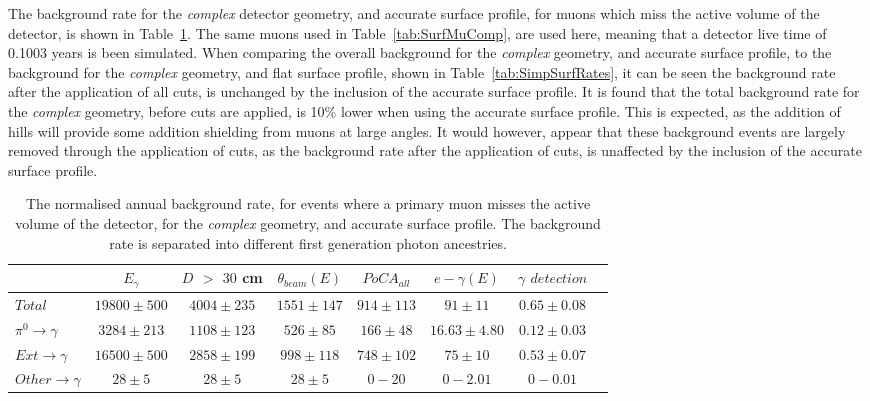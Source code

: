 The background rate for the \emph{complex} detector geometry, and accurate surface profile, for muons which miss the active volume of the detector, is shown in Table~\ref{tab:SurfMuMissComp}. The same muons used in Table~\ref{tab:SurfMuComp}, are used here, meaning that a detector live time of 0.1003 years is been simulated. When comparing the overall background for the \emph{complex} geometry, and accurate surface profile, to the background for the \emph{complex} geometry, and flat surface profile, shown in Table~\ref{tab:SimpSurfRates}, it can be seen the background rate after the application of all cuts, is unchanged by the inclusion of the accurate surface profile. It is found that the total background rate for the \emph{complex} geometry, before cuts are applied, is 10\% lower when using the accurate surface profile. This is expected, as the addition of hills will provide some addition shielding from muons at large angles. It would however, appear that these background events are largely removed through the application of cuts, as the background rate after the application of cuts, is unaffected by the inclusion of the accurate surface profile. \\

\begin{table}
  \caption[The normalised annual background rate, for events where a primary muon misses the active volume of the detector, for the \emph{complex} geometry, and accurate surface profile]
          {The normalised annual background rate, for events where a primary muon misses the active volume of the detector, for the \emph{complex} geometry, and accurate surface profile. The background rate is separated into different first generation photon ancestries.}
  \label{tab:SurfMuMissComp}
  \centering
  \scriptsize
  \begin{tabular}{l c c c c c c c }
    \toprule
        & $E_\gamma$ &  $D$ $>$ $30$ cm & $\theta_{beam}(E)$ & $PoCA_{all}$ & $e-\gamma(E)$ & $\gamma$ $detection$ \\
        \midrule
        $Total$          & $19800\pm500$ & $4004\pm235$ & $1551\pm147$ & $914\pm113$ & $91\pm11$      & $0.65\pm0.08$ \\

        $\pi^0\to\gamma$ & $3284\pm213$  & $1108\pm123$ & $526\pm85$   & $166\pm48$  & $16.63\pm4.80$ & $0.12\pm0.03$ \\

        $Ext\to\gamma$   & $16500\pm500$ & $2858\pm199$ & $998\pm118$  & $748\pm102$ & $75\pm10$      & $0.53\pm0.07$ \\

        $Other\to\gamma$ & $28\pm5$      & $28\pm5$     & $28\pm5$     & $0-20$      & $0-2.01$       & $0-0.01$ \\
        \bottomrule
  \end{tabular}
\end{table}

